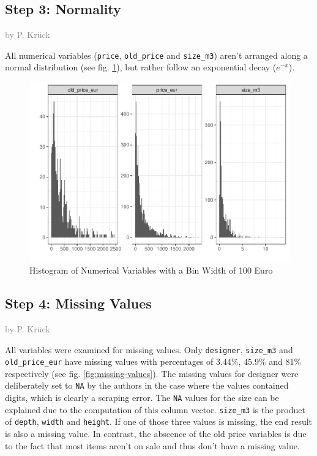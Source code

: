 \documentclass[a4paper, nobind]{templates/ociamthesis}
\begin{document}
\hypertarget{step-3-normality}{%
\subsection{Step 3: Normality}\label{step-3-normality}}

\textcolor{gray}{by P. Krück}

All numerical variables (\texttt{price}, \texttt{old\_price} and \texttt{size\_m3}) aren't arranged along a normal distribution (see fig. \ref{fig:normality}), but rather follow an exponential decay (\(e^{-x}\)).

\begin{figure}
\includegraphics[width=1\linewidth]{_main_files/figure-latex/normality-1} \caption{Histogram of Numerical Variables with a Bin Width of 100 Euro}\label{fig:normality}
\end{figure}

\hypertarget{missing-values}{%
\subsection{Step 4: Missing Values}\label{missing-values}}

\textcolor{gray}{by P. Krück}

All variables were examined for missing values. Only \texttt{designer}, \texttt{size\_m3} and \texttt{old\_price\_eur} have missing values with percentages of 3.44\%, 45.9\% and 81\% respectively (see fig. \ref{fig:missing-values}).
The missing values for designer were deliberately set to \texttt{NA} by the authors in the case where the values contained digits, which is clearly a scraping error.
The \texttt{NA} values for the size can be explained due to the computation of this column vector. \texttt{size\_m3} is the product of \texttt{depth}, \texttt{width} and \texttt{height}. If one of those three values is missing, the end result is also a missing value.
In contrast, the abscence of the old price variables is due to the fact that most items aren't on sale and thus don't have a missing value.
\end{document}
